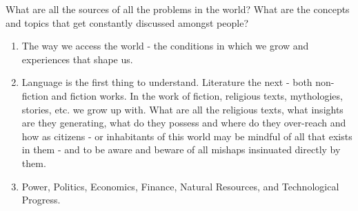 \documentclass{article}
\begin{document}
What are all the sources of all the problems in the world? What are the concepts and topics that get constantly discussed amongst people?

\begin{enumerate}
\item The way we access the world - the conditions in which we grow and experiences that shape us. 
\item Language is the first thing to understand. Literature the next - both non-fiction and fiction works. In the work of fiction, religious texts, mythologies, stories, etc. we grow up with. What are all the religious texts, what insights are they generating, what do they possess and where do they over-reach and how as citizens - or inhabitants of this world may be mindful of all that exists in them - and to be aware and beware of all mishaps insinuated directly by them.

\item Power, Politics, Economics, Finance, Natural Resources, and Technological Progress.
\end{enumerate}
\end{document}
